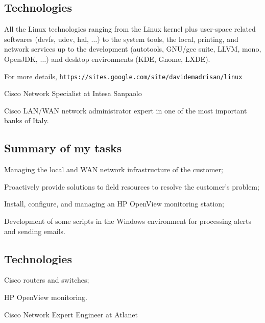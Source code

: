 \subsection{Technologies}

\noindent
All the Linux technologies ranging from the Linux kernel plus user-space 
related softwares (devfs, udev, hal, $\dots$) to the system tools, the local,
printing, and network services up to the development (autotools, GNU/gcc suite, 
LLVM, mono, OpenJDK, $\dots$) and desktop environments (KDE, Gnome, LXDE).

\nobreak
For more details,
\hfill\break\noindent
{\tt https:/\negthinspace/sites.google.com/site/davidemadrisan/linux}


\bigskip
{}
   {Cisco Network Specialist at Intesa Sanpaolo}

\noindent
Cisco LAN/WAN network administrator expert in one of the most important banks of Italy.

\subsection{Summary of my tasks}

\item{\bdot} Managing the local and WAN network infrastructure of the customer;
\item{\bdot} Proactively provide solutions to field resources to resolve the 
   customer's problem;
\item{\bdot} Install, configure, and managing an HP OpenView monitoring station;
\item{\bdot} Development of some scripts in the Windows environment for 
   processing alerts and sending emails.

\subsection{Technologies}

\item{\bdot} Cisco routers and switches;
\item{\bdot} HP OpenView monitoring.
 

\bigskip
{}
   {Cisco Network Expert Engineer at Atlanet}

